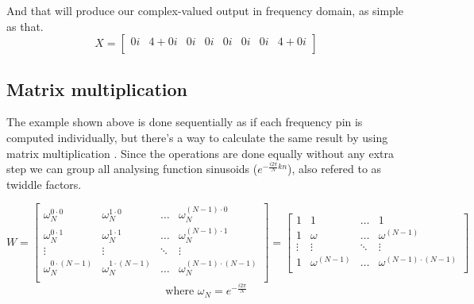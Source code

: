 \documentclass[
  oneside,
  11pt, a4paper,
  footinclude=true,
  headinclude=true,
  cleardoublepage=empty
]{scrbook}
\begin{document}
And that will produce our complex-valued output in frequency domain, as simple as that.
\begin{equation*}
    X = 
    \begin{bmatrix}
        0i & 4+0i & 0i & 0i & 0i & 0i & 0i & 4+0i\\
    \end{bmatrix}
\end{equation*}



\subsection{Matrix multiplication} \label{subsec:matrix-multiplication}
The example shown above is done sequentially as if each frequency pin is computed individually, but there's a way to calculate the same result by using matrix multiplication \cite{rao2018transform}. Since the operations are done equally without any extra step we can group all analysing function sinusoids (\(e^{- \frac{i 2 \pi}{N} k n}\)), also refered to as twiddle factors.


\begin{equation*}
    W = 
    \begin{bmatrix}
        \omega_{N}^{0 \cdot 0}     & \omega_{N}^{1 \cdot 0}     & \dots  & \omega_{N}^{(N-1) \cdot 0}     \\
        \omega_{N}^{0 \cdot 1}     & \omega_{N}^{1 \cdot 1}     & \dots  & \omega_{N}^{(N-1) \cdot 1}     \\
        \vdots                     & \vdots                     & \ddots & \vdots                          \\
        \omega_{N}^{0 \cdot (N-1)} & \omega_{N}^{1 \cdot (N-1)} & \dots  & \omega_{N}^{(N-1) \cdot (N-1)} \\
    \end{bmatrix} =
    \begin{bmatrix}
        1      & 1              & \dots  & 1                          \\
        1      & \omega         & \dots  & \omega^{(N-1)}             \\
        \vdots & \vdots         & \ddots & \vdots                     \\
        1      & \omega^{(N-1)} & \dots  & \omega^{(N-1) \cdot (N-1)} \\
    \end{bmatrix}
\end{equation*}
\begin{equation*}
    \text{where } \omega_{N} = e^{- \frac{i 2 \pi}{N}}
\end{equation*}
\end{document}

